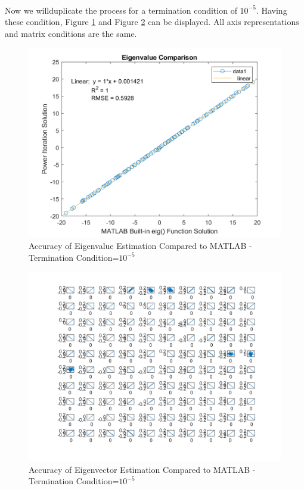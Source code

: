 \documentclass[letterpaper,12pt]{article}
\begin{document}
   \paragraph{} Now we willduplicate the process for a termination condition of $10^{-5}$. Having these condition, Figure \ref{fig:eigenvaluelowacc} and Figure \ref{fig:eigenvectorlowacc} can be displayed. All axis representations and matrix conditions are the same.
   \begin{figure}[H] 
      \centering \includegraphics[width=0.7\columnwidth]{figures/eigenvaluelowacc.png}           
                     \caption{Accuracy of Eigenvalue Estimation Compared to MATLAB - Termination Condition=$10^{-5}$}                
                        \label{fig:eigenvaluelowacc}
      \end{figure}  

   \begin{figure}[H] 
      \centering \includegraphics[width=0.7\columnwidth]{figures/eigenvectorlowacc.png}           
                     \caption{Accuracy of Eigenvector Estimation Compared to MATLAB - Termination Condition=$10^{-5}$}                
                        \label{fig:eigenvectorlowacc}
      \end{figure}
\end{document}
